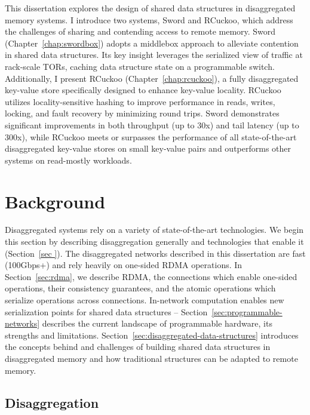 \documentclass[12pt]{ucsddissertation}
\begin{document}
\begin{dissertationintroduction}
This dissertation explores the design of shared data structures in disaggregated memory systems. I
introduce two systems, Sword and RCuckoo, which address the challenges of sharing and contending
access to remote memory. Sword (Chapter~\ref{chap:swordbox}) adopts a middlebox approach to alleviate
contention in shared data structures. Its key insight leverages the serialized view of traffic at
rack-scale TORs, caching data structure state on a programmable switch. Additionally, I present
RCuckoo (Chapter~\ref{chap:rcuckoo}), a fully disaggregated key-value store specifically designed to
enhance key-value locality. RCuckoo utilizes locality-sensitive hashing to improve performance in
reads, writes, locking, and fault recovery by minimizing round trips. Sword demonstrates significant
improvements in both throughput (up to 30x) and tail latency (up to 300x), while RCuckoo meets or
surpasses the performance of all state-of-the-art disaggregated key-value stores on small key-value
pairs and outperforms other systems on read-mostly workloads.

\end{dissertationintroduction}

\chapter{Background}


Disaggregated systems rely on a variety of state-of-the-art technologies. We begin this section by
describing disaggregation generally and technologies that enable it (Section~\ref{sec }). The
disaggregated networks described in this dissertation are fast (100Gbps+) and rely heavily on
one-sided RDMA operations. In Section~\ref{sec:rdma}, we describe RDMA, the connections which enable
one-sided operations, their consistency guarantees, and the atomic operations which serialize
operations across connections. In-network computation enables new serialization points for shared
data structures -- Section~\ref{sec:programmable-networks} describes the current landscape of
programmable hardware, its strengths and limitations.
Section~\ref{sec:disaggregated-data-structures} introduces the concepts behind and challenges of
building shared data structures in disaggregated memory and how traditional structures can be
adapted to remote memory.


\section{Disaggregation}
\label{sec:disaggregation}
\end{document}
